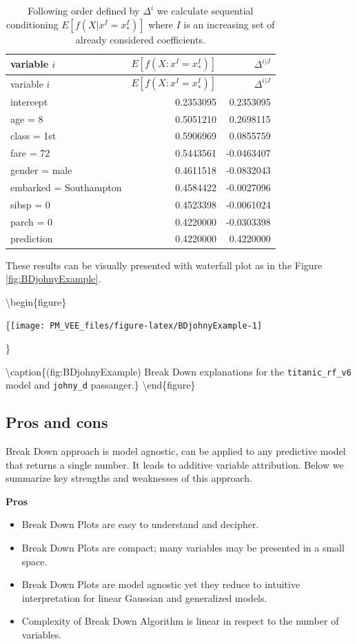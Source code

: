 \documentclass[12pt,]{krantz}
\providecommand{\tightlist}{%
  \setlength{\itemsep}{0pt}\setlength{\parskip}{0pt}}
\theoremstyle{definition}
\theoremstyle{definition}
\theoremstyle{definition}
\theoremstyle{remark}
\begin{document}
\begin{longtable}[]{@{}lrr@{}}
\caption{\label{tab:titanicBreakDownDeltasConseq} Following order defined by
\(\Delta^i\) we calculate sequential conditioning
\(E[f(X|x^I = x^I_*)]\) where \(I\) is an increasing set of already
considered coefficients.}\tabularnewline
\toprule
variable \(i\) & \(E[f(X : x^I = x^I_*)]\) &
\(\Delta^{i|J}\)\tabularnewline
\midrule
\endfirsthead
\toprule
variable \(i\) & \(E[f(X : x^I = x^I_*)]\) &
\(\Delta^{i|J}\)\tabularnewline
\midrule
\endhead
intercept & 0.2353095 & 0.2353095\tabularnewline
age = 8 & 0.5051210 & 0.2698115\tabularnewline
class = 1st & 0.5906969 & 0.0855759\tabularnewline
fare = 72 & 0.5443561 & -0.0463407\tabularnewline
gender = male & 0.4611518 & -0.0832043\tabularnewline
embarked = Southampton & 0.4584422 & -0.0027096\tabularnewline
sibsp = 0 & 0.4523398 & -0.0061024\tabularnewline
parch = 0 & 0.4220000 & -0.0303398\tabularnewline
prediction & 0.4220000 & 0.4220000\tabularnewline
\bottomrule
\end{longtable}

These results can be visually presented with waterfall plot as in the
Figure \ref{fig:BDjohnyExample}.

\textbackslash{}begin\{figure\}

\{\centering \texttt{[image: PM\_VEE\_files/figure-latex/BDjohnyExample-1]}

\}

\textbackslash{}caption\{(fig:BDjohnyExample) Break Down explanations
for the \texttt{titanic\_rf\_v6} model and \texttt{johny\_d}
passanger.\}\label{fig:BDjohnyExample} \textbackslash{}end\{figure\}

\hypertarget{pros-and-cons}{%
\subsection{Pros and cons}\label{pros-and-cons}}

Break Down approach is model agnostic, can be applied to any predictive
model that returns a single number. It leads to additive variable
attribution. Below we summarize key strengths and weaknesses of this
approach.

\textbf{Pros}

\begin{itemize}
\tightlist
\item
  Break Down Plots are easy to understand and decipher.
\item
  Break Down Plots are compact; many variables may be presented in a
  small space.
\item
  Break Down Plots are model agnostic yet they reduce to intuitive
  interpretation for linear Gaussian and generalized models.
\item
  Complexity of Break Down Algorithm is linear in respect to the number
  of variables.
\end{itemize}
\end{document}
